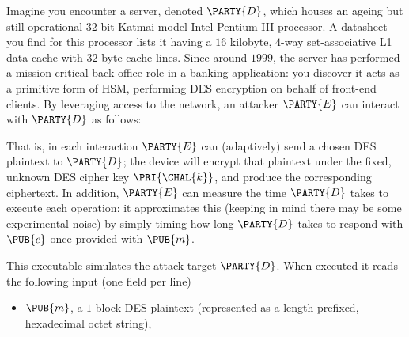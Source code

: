 %



Imagine you encounter a server, denoted $\PARTY{D}$, 
which houses an ageing but still operational $32$-bit Katmai model Intel 
Pentium III processor.  
A datasheet you find for this processor lists it having a $16$ kilobyte, 
$4$-way set-associative L1 data cache with $32$ byte cache lines.  Since
around $1999$, the server has performed a mission-critical back-office 
role in a banking application: you discover it acts as a primitive form 
of HSM, performing DES encryption on behalf of front-end clients.
By leveraging access to the network, 
an attacker $\PARTY{E}$ can interact with $\PARTY{D}$ as follows:

\begin{center}

\end{center}

\noindent
That is, in each interaction $\PARTY{E}$ can (adaptively) send 
a chosen DES  plaintext
to $\PARTY{D}$; the device will
encrypt that  plaintext under the fixed, unknown DES cipher key $\PRI{\CHAL{k}}$,
and produce 
the corresponding ciphertext.
In addition, $\PARTY{E}$ can measure the time $\PARTY{D}$ takes to execute 
each operation: it approximates this 
(keeping in mind there may be some experimental noise) 
by simply timing how long $\PARTY{D}$ takes to respond with $\PUB{c}$ once 
provided with $\PUB{m}$.




This executable simulates the attack target $\PARTY{D}$.  When executed it 
 reads the following  input (one field per line)

\begin{itemize}
\item $\PUB{m}$, 
      a  ${1}$-block DES plaintext 
      (represented as a  length-prefixed, hexadecimal octet   string), 
\end{itemize}

